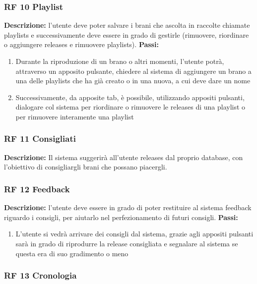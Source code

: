 \documentclass[a4paper,12pt]{article}
\begin{document}
\subsubsection*{RF 10 Playlist}

\textbf{Descrizione:} l’utente deve poter salvare i brani che ascolta in raccolte chiamate playlists e successivamente deve essere in grado di gestirle (rimuovere, riordinare o aggiungere releases e rimuovere playlists). \newline
\textbf{Passi:}
\begin{enumerate}
   \item Durante la riproduzione di un brano o altri momenti, l’utente potrà, attraverso un apposito pulsante, chiedere al sistema di aggiungere un brano a una delle playlists che ha già creato o in una nuova, a cui deve dare un nome
    \item Successivamente, da apposite tab, è possibile, utilizzando appositi pulsanti, dialogare col sistema per riordinare o rimuovere le releases di una playlist o per rimuovere interamente una playlist
\end{enumerate}

\subsubsection*{RF 11 Consigliati}

\textbf{Descrizione:} Il sistema suggerirà all’utente releases dal proprio database, con l'obiettivo di consigliargli brani che possano piacergli.

\subsubsection*{RF 12 Feedback}

\textbf{Descrizione:} l’utente deve essere in grado di poter restituire al sistema feedback riguardo i consigli, per aiutarlo nel perfezionamento di futuri consigli. \newline
\textbf{Passi:}
\begin{enumerate}
   \item L’utente si vedrà arrivare dei consigli dal sistema, grazie agli appositi pulsanti sarà in grado di riprodurre la release consigliata e segnalare al sistema se questa era di suo gradimento o meno
\end{enumerate}

\subsubsection*{RF 13 Cronologia}
\end{document}

